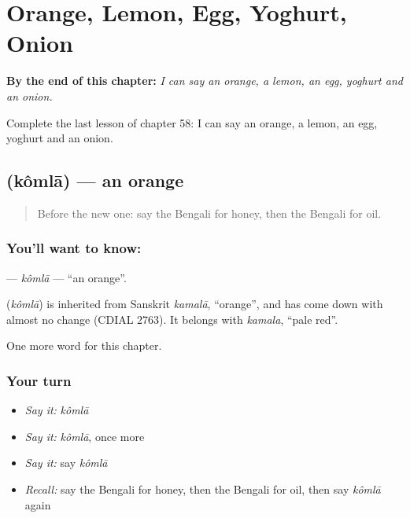 
\chapter{Orange, Lemon, Egg, Yoghurt, Onion}
\label{ch:bn-orange-lemon-egg-yoghurt-onion}

\begin{chapteropening}
\textbf{By the end of this chapter:} \emph{I can say an orange, a lemon, an egg, yoghurt and an onion.}

Complete the last lesson of chapter 58: I can say an orange, a lemon, an egg, yoghurt and an onion.
\end{chapteropening}

\section[\texorpdfstring{\bn{কমলা} (kômlā)}{কমলা (kômlā)}]{ (kômlā) — an orange}

\label{lesson:BN-C58-komla}



\begin{quote}
Before the new one: say the Bengali for honey, then the Bengali for oil.
\end{quote}

\subsection*{You'll want to know: }
\textbf{} — \emph{kômlā} — \textquotedblleft{}an orange\textquotedblright{}.

\begin{cousinweb}
\textbf{} (\emph{kômlā}) is inherited from Sanskrit \emph{kamalā}, \textquotedblleft{}orange\textquotedblright{}, and has come down with almost no change (CDIAL 2763). It belongs with \emph{kamala}, \textquotedblleft{}pale red\textquotedblright{}.
\end{cousinweb}

\begin{grammarlens}[title={What you've built}]
One more word for this chapter.
\end{grammarlens}

\subsection*{Your turn}
\begin{itemize}
\raggedright
  \item \emph{Say it:} \emph{kômlā}
  \item \emph{Say it:} \emph{kômlā}, once more
  \item \emph{Say it:} say \emph{kômlā}
  \item \emph{Recall:} say the Bengali for honey, then the Bengali for oil, then say \emph{kômlā} again
\end{itemize}


